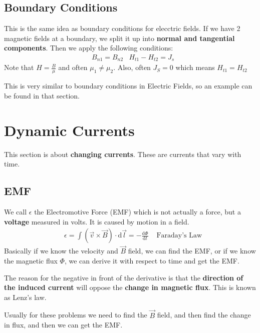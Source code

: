 \documentclass[12pt,letterpaper]{article} \usepackage{amsmath} \usepackage{graphicx} \usepackage[margin=1in]{geometry} \usepackage{longtable}  \usepackage{amssymb}
\begin{document}
	\subsection{Boundary Conditions}
	This is the same idea as boundary conditions for elecctric fields. If we have 2 magnetic fields at a boundary, we split it up into \textbf{normal and tangential components}. Then we apply the following conditions:
	\begin{align*}
		&B_{n1} = B_{n2} &H_{t1} - H_{t2} = J_s
	\end{align*}
	Note that $H = \frac{B}{\mu}$ and often $\mu_1 \ne \mu_2$. Also, often $J_S=0$ which means $H_{t1} = H_{t2}$
	
	\begin{mdframed}
		This is very similar to boundary conditions in Electric Fields, so an example can be found in that section.
	\end{mdframed}
	
	\section{Dynamic Currents}
	This section is about \textbf{changing currents}. These are currents that vary with time. 
	
	\subsection{EMF}
	We call $\epsilon$ the Electromotive Force (EMF) which is not actually a force, but a \textbf{voltage} measured in volts. It is caused by motion in a field. 
	\begin{align*}
		&\epsilon = \int(\vec v \times \vec B)\cdot \mathrm d \vec l = -\frac{\mathrm d \Phi}{\mathrm d t} &\text{ Faraday's Law}
	\end{align*}
	Basically if we know the velocity and $\vec B$ field, we can find the EMF, or if we know the magnetic flux $\Phi$, we can derive it with respect to time and get the EMF. 
	
	The reason for the negative in front of the derivative is that the \textbf{direction of the induced current} will oppose the \textbf{change in magnetic flux}. This is known as Lenz's law.
	
	Usually for these problems we need to find the $\vec B$ field, and then find the change in flux, and then we can get the EMF. 
	
\end{document}
